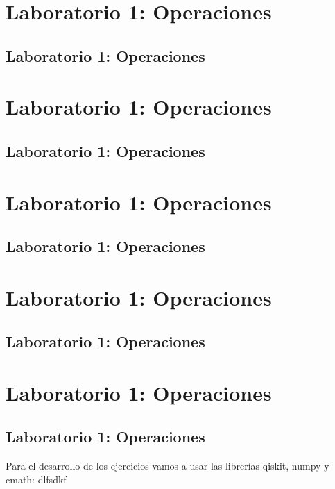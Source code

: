 \documentclass[11pt]{article}
\begin{document}
	
	
	
	
	
	

	
	\section{Laboratorio 1: Operaciones}

	\subsection{Laboratorio 1: Operaciones}

	\section{Laboratorio 1: Operaciones}

	\subsection{Laboratorio 1: Operaciones}

	\section{Laboratorio 1: Operaciones}

	\subsection{Laboratorio 1: Operaciones}

	\section{Laboratorio 1: Operaciones}

	\subsection{Laboratorio 1: Operaciones}

	\section{Laboratorio 1: Operaciones}

	\subsection{Laboratorio 1: Operaciones}

	Para el desarrollo de los ejercicios vamos a usar las librerías qiskit, numpy y cmath:
	\newpage
	dlfsdkf
\end{document}
